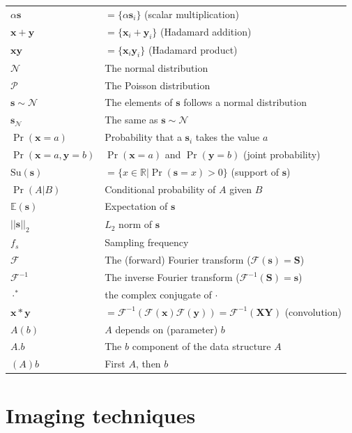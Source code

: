 \documentclass{article}
\begin{document}
\begin{tabular}{ll}
  $\alpha\mathbf{s}$ & $=\{\alpha\mathbf{s}_i\}$ (scalar multiplication) \\
  $\mathbf{x}+\mathbf{y}$ & $=\{\mathbf{x}_i + \mathbf{y}_i\}$ (Hadamard addition) \\ 
  $\mathbf{x}\mathbf{y}$ & $=\{\mathbf{x}_i\mathbf{y}_i\}$ (Hadamard product) \\ 
  $\mathcal{N}$ & The normal distribution \\ 
  $\mathcal{P}$ & The Poisson distribution \\
  $\mathbf{s}\sim\mathcal{N}$ & The elements of $\mathbf{s}$ follows a normal distribution \\
  $\mathbf{s}_{\mathcal{N}}$ & The same as $\mathbf{s}\sim\mathcal{N}$ \\
  $\Pr(\mathbf{x}=a)$ & Probability that a $\mathbf{s}_i$ takes the value $a$ \\
  $\Pr(\mathbf{x}=a, \mathbf{y}=b)$ & $\Pr(\mathbf{x}=a)$ and $\Pr(\mathbf{y}=b)$ (joint probability)  \\
  $\mathrm{Su}(\mathbf{s})$ & $=\{x\in\mathbb{R}|\Pr(\mathbf{s}=x)>0\}$ (support of $\mathbf{s}$)\\
  $\Pr(A|B)$ & Conditional probability of $A$ given $B$ \\
  $\mathbb{E}(\mathbf{s})$ & Expectation of $\mathbf{s}$ \\
  $||\mathbf{s}||_2$ & $L_2$ norm of $\mathbf{s}$ \\
  $f_s$ & Sampling frequency \\
  $\mathcal{F}$ & The (forward) Fourier transform ($\mathcal{F}(\mathbf{s})=\mathbf{S}$) \\
  $\mathcal{F}^{-1}$ & The inverse Fourier transform ($\mathcal{F}^{-1}(\mathbf{S})=\mathbf{s}$) \\
  $\cdot^*$ & the complex conjugate of $\cdot$ \\
  $\mathbf{x}*\mathbf{y}$ & $=\mathcal{F}^{-1}(\mathcal{F}(\mathbf{x})\mathcal{F}(\mathbf{y}))=\mathcal{F}^{-1}(\mathbf{X}\mathbf{Y})$ (convolution) \\
  $A(b)$ & $A$ depends on (parameter) $b$ \\
  $A.b$ & The $b$ component of the data structure $A$ \\
  $(A)b$ & First $A$, then $b$ 
\end{tabular}


\section{Imaging techniques}
\end{document}
